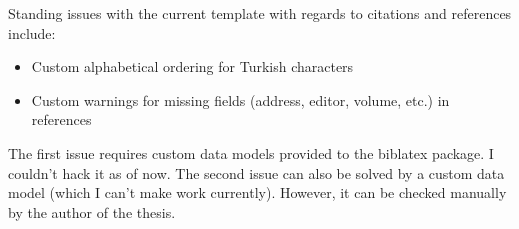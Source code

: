 Standing issues with the current template with regards to citations and references include:

\begin{itemize}
    \item Custom alphabetical ordering for Turkish characters
    \item Custom warnings for missing fields (address, editor, volume, etc.) in references
\end{itemize}

The first issue requires custom data models provided to the biblatex package. I couldn't hack it as of now. The second issue can also be solved by a custom data model (which I can't make work currently). However, it can be checked manually by the author of the thesis.
